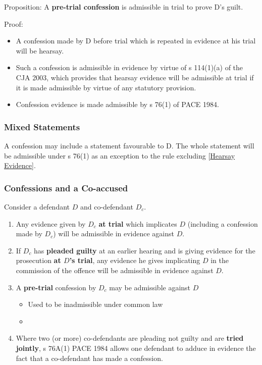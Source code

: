 \documentclass[
]{article}
\providecommand{\tightlist}{%
  \setlength{\itemsep}{0pt}\setlength{\parskip}{0pt}}
\begin{document}
Proposition: A \textbf{pre-trial confession} is admissible in trial to
prove D's guilt.

Proof:

\begin{itemize}
\tightlist
\item
  A confession made by D before trial which is repeated in evidence at
  his trial will be hearsay.
\item
  Such a confession is admissible in evidence by virtue of s 114(1)(a)
  of the CJA 2003, which provides that hearsay evidence will be
  admissible at trial if it is made admissible by virtue of any
  statutory provision.
\item
  Confession evidence is made admissible by s 76(1) of PACE 1984.
\end{itemize}

\hypertarget{mixed-statements}{%
\subsubsection{Mixed Statements}\label{mixed-statements}}

A confession may include a statement favourable to D. The whole
statement will be admissible under s 76(1) as an exception to the rule
excluding {[}\protect\hyperlink{hearsay-evidence}{Hearsay Evidence}{]}.

\hypertarget{confessions-and-a-co-accused}{%
\subsubsection{Confessions and a
Co-accused}\label{confessions-and-a-co-accused}}

Consider a defendant \(D\) and co-defendant \(D_c\).

\begin{enumerate}
\def\labelenumi{\arabic{enumi}.}
\tightlist
\item
  Any evidence given by \(D_c\) \textbf{at trial} which implicates \(D\)
  (including a confession made by \(D_c\)) will be admissible in
  evidence against \(D\).
\item
  If \(D_c\) has \textbf{pleaded guilty} at an earlier hearing and is
  giving evidence for the prosecution \textbf{at \(D\)'s trial}, any
  evidence he gives implicating \(D\) in the commission of the offence
  will be admissible in evidence against \(D\).
\item
  A \textbf{pre-trial} confession by \(D_c\) may be admissible against
  \(D\)

  \begin{itemize}
  \tightlist
  \item
    Used to be inadmissible under common law
  \item
  \end{itemize}
\item
  Where two (or more) co-defendants are pleading not guilty and are
  \textbf{tried jointly}, s 76A(1) PACE 1984 allows one defendant to
  adduce in evidence the fact that a co-defendant has made a confession.
\end{enumerate}
\end{document}
